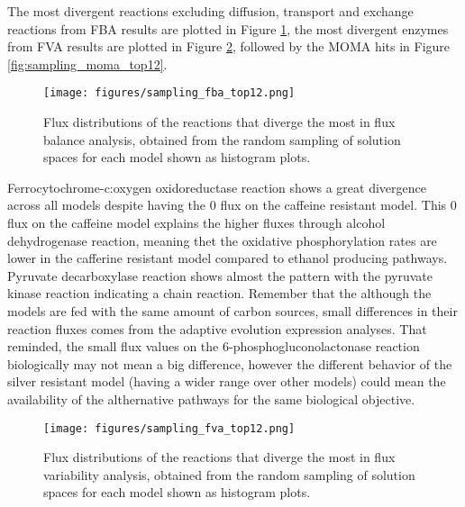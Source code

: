 The most divergent reactions excluding diffusion, transport and exchange reactions from FBA results are plotted in Figure \ref{fig:sampling_fba_top12}, the most divergent enzymes from FVA results are plotted in Figure \ref{fig:sampling_fva_top12}, followed by the MOMA hits in Figure \ref{fig:sampling_moma_top12}.

\begin{figure}[H]
  \begin{center}
  \texttt{[image: figures/sampling\_fba\_top12.png]}
  \caption[Flux distributions of the reactions that diverge the most in flux balance analysis, obtained from the random sampling of solution spaces for each model shown as histogram plots]{Flux distributions of the reactions that diverge the most in flux balance analysis, obtained from the random sampling of solution spaces for each model shown as histogram plots.}
  \label{fig:sampling_fba_top12}
  \end{center}
\end{figure}

Ferrocytochrome-c:oxygen oxidoreductase reaction shows a great divergence across all models despite having the 0 flux on the caffeine resistant model. This 0 flux on the caffeine model explains the higher fluxes through alcohol dehydrogenase reaction, meaning thet the oxidative phosphorylation rates are lower in the cafferine resistant model compared to ethanol producing pathways. Pyruvate decarboxylase reaction shows almost the pattern with the pyruvate kinase reaction indicating a chain reaction. Remember that the although the models are fed with the same amount of carbon sources, small differences in their reaction fluxes comes from the adaptive evolution expression analyses. That reminded, the small flux values on the 6-phosphogluconolactonase reaction biologically may not mean a big difference, however the different behavior of the silver resistant model (having a wider range over other models) could mean the availability of the althernative pathways for the same biological objective.


\begin{figure}[H]
  \begin{center}
  \texttt{[image: figures/sampling\_fva\_top12.png]}
  \caption[Flux distributions of the reactions that diverge the most in flux variability analysis, obtained from the random sampling of solution spaces for each model shown as histogram plots]{Flux distributions of the reactions that diverge the most in flux variability analysis, obtained from the random sampling of solution spaces for each model shown as histogram plots.}
  \label{fig:sampling_fva_top12}
  \end{center}
\end{figure}

